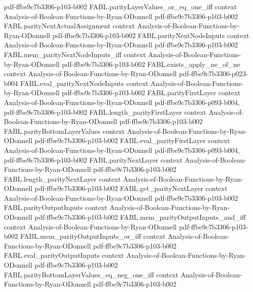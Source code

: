 \begin{theorem}
  {pdf-ffbe9c7b3306-p103-b002}
\proofstep
  {FABL.parityLayerValues_or_eq_one_iff}
  {context}
  {Analysis-of-Boolean-Functions-by-Ryan-ODonnell}
  {pdf-ffbe9c7b3306-p103-b002}
\proofstep
  {FABL.parityNextActualAssignment}
  {context}
  {Analysis-of-Boolean-Functions-by-Ryan-ODonnell}
  {pdf-ffbe9c7b3306-p103-b002}
\proofstep
  {FABL.parityNextNodeInputs}
  {context}
  {Analysis-of-Boolean-Functions-by-Ryan-ODonnell}
  {pdf-ffbe9c7b3306-p103-b002}
\proofstep
  {FABL.mem_parityNextNodeInputs_iff}
  {context}
  {Analysis-of-Boolean-Functions-by-Ryan-ODonnell}
  {pdf-ffbe9c7b3306-p103-b002}
\proofstep
  {FABL.exists_apply_ne_of_ne}
  {context}
  {Analysis-of-Boolean-Functions-by-Ryan-ODonnell}
  {pdf-ffbe9c7b3306-p023-b004}
\proofstep
  {FABL.eval_parityNextNodeInputs}
  {context}
  {Analysis-of-Boolean-Functions-by-Ryan-ODonnell}
  {pdf-ffbe9c7b3306-p103-b002}
\proofstep
  {FABL.parityFirstLayer}
  {context}
  {Analysis-of-Boolean-Functions-by-Ryan-ODonnell}
  {pdf-ffbe9c7b3306-p093-b004,
    pdf-ffbe9c7b3306-p103-b002}
\proofstep
  {FABL.length_parityFirstLayer}
  {context}
  {Analysis-of-Boolean-Functions-by-Ryan-ODonnell}
  {pdf-ffbe9c7b3306-p103-b002}
\proofstep
  {FABL.parityBottomLayerValues}
  {context}
  {Analysis-of-Boolean-Functions-by-Ryan-ODonnell}
  {pdf-ffbe9c7b3306-p103-b002}
\proofstep
  {FABL.eval_parityFirstLayer}
  {context}
  {Analysis-of-Boolean-Functions-by-Ryan-ODonnell}
  {pdf-ffbe9c7b3306-p093-b004,
    pdf-ffbe9c7b3306-p103-b002}
\proofstep
  {FABL.parityNextLayer}
  {context}
  {Analysis-of-Boolean-Functions-by-Ryan-ODonnell}
  {pdf-ffbe9c7b3306-p103-b002}
\proofstep
  {FABL.length_parityNextLayer}
  {context}
  {Analysis-of-Boolean-Functions-by-Ryan-ODonnell}
  {pdf-ffbe9c7b3306-p103-b002}
\proofstep
  {FABL.get_parityNextLayer}
  {context}
  {Analysis-of-Boolean-Functions-by-Ryan-ODonnell}
  {pdf-ffbe9c7b3306-p103-b002}
\proofstep
  {FABL.parityOutputInputs}
  {context}
  {Analysis-of-Boolean-Functions-by-Ryan-ODonnell}
  {pdf-ffbe9c7b3306-p103-b002}
\proofstep
  {FABL.mem_parityOutputInputs_and_iff}
  {context}
  {Analysis-of-Boolean-Functions-by-Ryan-ODonnell}
  {pdf-ffbe9c7b3306-p103-b002}
\proofstep
  {FABL.mem_parityOutputInputs_or_iff}
  {context}
  {Analysis-of-Boolean-Functions-by-Ryan-ODonnell}
  {pdf-ffbe9c7b3306-p103-b002}
\proofstep
  {FABL.eval_parityOutputInputs}
  {context}
  {Analysis-of-Boolean-Functions-by-Ryan-ODonnell}
  {pdf-ffbe9c7b3306-p103-b002}
\proofstep
  {FABL.parityBottomLayerValues_eq_neg_one_iff}
  {context}
  {Analysis-of-Boolean-Functions-by-Ryan-ODonnell}
  {pdf-ffbe9c7b3306-p103-b002}
\proofstep

\end{theorem}
